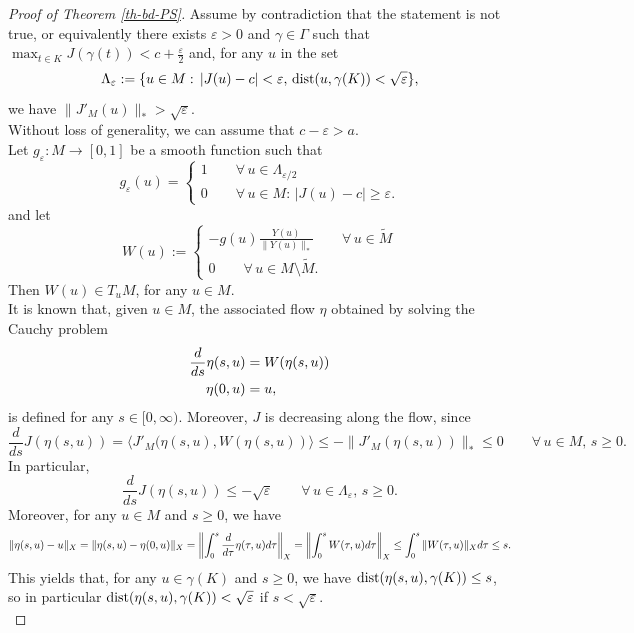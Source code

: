 \documentclass[11pt,reqno]{amsart}
\theoremstyle{definition}
\numberwithin{equation}{section}
\numberwithin{theorem}{section}
\numberwithin{equation}{section}
\numberwithin{theorem}{section}
\begin{document}
\begin{proof}[Proof of Theorem \ref{th-bd-PS}]
Assume by contradiction that the statement is not true, or equivalently there exists $\varepsilon>0$ and $\gamma\in\Gamma$ such that $\max_{t\in K}J(\gamma(t))<c+\frac{\varepsilon}{2}$ and, for any $u$ in the set
$$\Lambda_\varepsilon:=\{u\in M:\, |J(u)-c|<\varepsilon,\,{\rm dist}(u,\gamma(K))<\sqrt{\varepsilon}\},$$
we have $\|J'_M(u)\|_\ast>\sqrt{\varepsilon}$.\\

Without loss of generality, we can assume that $c-\varepsilon>a$.\\

Let $g_\varepsilon:M\to[0,1]$ be a smooth function such that 
$$g_\varepsilon(u)=
\begin{cases}
1\qquad\forall\, u\in\Lambda_{\varepsilon/2} \\
0\qquad\forall\, u\in M:\,|J(u)-c|\ge \varepsilon.
\end{cases}
$$
and let
$$W(u):=
\begin{cases}
-g(u)\frac{Y(u)}{\|Y(u)\|_\ast}\qquad\forall\,u\in \tilde{M}\\
0\qquad\forall\,u\in M\setminus\tilde{M}.
\end{cases}
$$
Then $W(u)\in T_u M$, for any $u\in M$.\\

It is known that, given $u\in M$, the associated flow $\eta$ obtained by solving the Cauchy problem
\begin{equation}\notag
\begin{aligned}
\frac{d}{ds}\eta(s,u)&=W(\eta(s,u))\\   
\eta(0,u)&=u,
\end{aligned}    
\end{equation}
is defined for any $s\in[0,\infty)$. Moreover, $J$ is decreasing along the flow, since $$\frac{d}{ds}J(\eta(s,u))=\langle J'_M(\eta(s,u),W(\eta(s,u))\rangle\le-\|J'_M(\eta(s,u))\|_\ast\le 0\qquad\forall\, u\in M,\,s\ge 0.$$
In particular, $$\frac{d}{ds}J(\eta(s,u))\le-\sqrt{\varepsilon}\qquad\forall\,u\in\Lambda_\varepsilon,\,s\ge 0.$$ 
Moreover, for any $u\in M$ and $s\ge 0$, we have
\begin{equation}\notag
\|\eta(s,u)-u\|_X=\|\eta(s,u)-\eta(0,u)\|_X  =\left\|\int_0^s\frac{d}{d\tau}\eta(\tau,u)d\tau\right\|_X=\left\|\int_0^s W(\tau,u)d\tau\right\|_X\le \int_0^s \|W(\tau,u)\|_Xd\tau\le s.
\end{equation}
This yields that, for any $u\in\gamma(K)$ and $s\ge 0$, we have ${\rm dist}(\eta(s,u),\gamma(K))\le s$, so in particular ${\rm dist}(\eta(s,u),\gamma(K))<\sqrt{\varepsilon}$ if $s<\sqrt{\varepsilon}$.\\


\end{proof}
\end{document}
